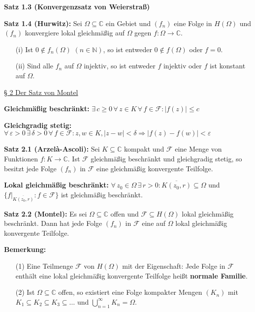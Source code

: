 \documentclass[11pt]{article}
\newcommand{\C}{\mathbb{C}}
\newcommand{\N}{\mathbb{N}}
\begin{document}
\textbf{Satz 1.3 (Konvergenzsatz von Weierstraß)}

\textbf{Satz 1.4 (Hurwitz):} Sei $\Omega \subseteq \C$ ein Gebiet und $(f_n)$ eine Folge in $H(\Omega)$ und $(f_n)$ konvergiere lokal gleichmäßig auf $\Omega$ gegen $f \colon \Omega \to \C$.
\vspace{-0.6cm}
\begin{itemize}
\item[(i)] Ist $0 \notin f_n(\Omega)$ $(n \in \N)$, so ist entweder $0 \notin f(\Omega)$ oder $f=0$. \vspace{-0.2cm}
\item[(ii)] Sind alle $f_n$ auf $\Omega$ injektiv, so ist entweder $f$ injektiv oder $f$ ist konstant auf $\Omega$. 
\end{itemize}
\vspace{-0.3cm}

\underline{§ 2 Der Satz von Montel}

\textbf{Gleichmäßig beschränkt:} $\exists \, c \geq 0 \, \forall \, z \in K \, \forall \, f \in \mathcal{F} \colon |f(z)| \leq c$

\textbf{Gleichgradig stetig:} $\forall \, \varepsilon > 0 \, \exists \, \delta > 0 \, \forall \, f \in \mathcal{F} \colon z,w \in K, |z-w| < \delta \Rightarrow |f(z) - f(w)| < \varepsilon$

\textbf{Satz 2.1 (Arzelà-Ascoli):} Sei $K \subseteq \C$ kompakt und $\mathcal{F}$ eine Menge von Funktionen $f\colon K \to \C$. Ist $\mathcal{F}$ gleichmäßig beschränkt und gleichgradig stetig, so besitzt jede Folge $(f_n)$ in $\mathcal{F}$ eine gleichmäßig konvergente Teilfolge.

\textbf{Lokal gleichmäßig beschränkt:} $\forall \, z_0 \in \Omega \, \exists \, r > 0 \colon \overline{K(z_0, r)} \subseteq \Omega$ und $\{ f|_{\overline{K(z_0,r)}} \colon f \in \mathcal{F}\}$ ist gleichmäßig beschränkt. 

\textbf{Satz 2.2 (Montel):} Es sei $\Omega \subseteq \C$ offen und $\mathcal{F} \subseteq H(\Omega)$ lokal gleichmäßig beschränkt. Dann hat jede Folge $(f_n)$ in $\mathcal{F}$ eine auf $\Omega$ lokal gleichmäßig konvergente Teilfolge.

\textbf{Bemerkung:} 
\vspace{-0.6cm}
\begin{itemize}
\item[(1)] Eine Teilmenge $\mathcal{F}$ von $H(\Omega)$ mit der Eigenschaft: \glqq Jede Folge in $\mathcal{F}$ enthält eine lokal gleichmäßig konvergente Teilfolge\grqq{} heißt \textbf{normale Familie}. \vspace{-0.2cm}
\item[(2)] Ist $\Omega \subseteq \C$ offen, so existiert eine Folge kompakter Mengen $(K_n)$ mit $K_1 \subseteq K_2 \subseteq K_3 \subseteq \dots$ und $\bigcup_{n=1}^\infty K_n = \Omega$.
\end{itemize}
\vspace{-0.3cm}
\end{document}

